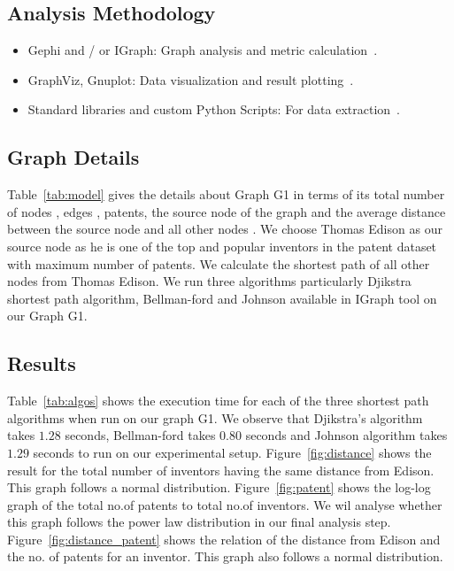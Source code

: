 \subsection{Analysis Methodology}

\begin{itemize}
\squish
\item Gephi and / or IGraph: Graph analysis and metric calculation~\cite{gephi, igraph}.

\item GraphViz, Gnuplot: Data visualization and result plotting~\cite{graphviz, gnuplot}.

\item Standard libraries and custom Python Scripts: For data extraction~\cite{python}.
\end{itemize}

\subsection{Graph Details}
Table~\ref{tab:model} gives the details about Graph G1 in
terms of its total number of nodes , edges , patents, the source node  of the graph
and the average distance between the source node and all other nodes .  
 We choose Thomas Edison as our source node
as he is one of the top and popular inventors in the patent dataset with maximum number of patents.
We calculate the shortest path of all other nodes from Thomas Edison. 
We run three algorithms particularly Djikstra shortest path algorithm, Bellman-ford and Johnson 
available in IGraph tool on our Graph G1. 

\subsection{Results}
Table~\ref{tab:algos} shows the execution time for each of the three shortest path algorithms 
when run on our graph G1. We observe that Djikstra's algorithm takes $1.28$ seconds, Bellman-ford takes
$0.80$ seconds and Johnson algorithm takes $1.29$ seconds to run on our experimental setup.
Figure~\ref{fig:distance} shows the result for the total number of inventors having the same
distance from Edison. This graph follows a normal distribution. Figure~\ref{fig:patent} shows the log-log graph of the total no.of patents
to total no.of inventors. We wil analyse whether this graph follows the power law distribution in our 
final analysis step. Figure~\ref{fig:distance_patent} shows the relation of the distance from Edison and
the no. of patents for an inventor. This graph also follows a normal distribution.

